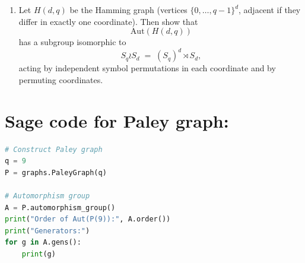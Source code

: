 \documentclass[12pt,a4paper,openany]{book}
\begin{document}
\begin{enumerate}
For any $b \in \mathbb{F}_q$, define the translation
\[
\tau_b: x \mapsto x+b.
\]
If $x \sim y$ in $P(q)$, then $x-y \in (\mathbb{F}_q^\times)^2$, so
\[
\tau_b(x) - \tau_b(y) = (x+b)-(y+b) = x-y \in (\mathbb{F}_q^\times)^2.
\]
Thus, $\tau_b$ is an automorphism. The set of all translations forms a group isomorphic to $(\mathbb{F}_q,+)$.



Let $a \in (\mathbb{F}_q^\times)^2$ be a nonzero square, and define
\[
\mu_a: x \mapsto ax.
\]
If $x \sim y$, then $x-y$ is a square, so
\[
\mu_a(x) - \mu_a(y) = a(x-y)
\]
is also a square. Hence, $\mu_a$ is an automorphism. The set of all such $\mu_a$ forms a group of order $(q-1)/2$.



Let $\sigma \in \mathrm{Gal}(\mathbb{F}_q / \mathbb{F}_p)$, where $q = p^n$ and $p$ is the characteristic of $\mathbb{F}_q$. Then $\sigma$ is a field automorphism:
\[
x \mapsto \sigma(x), \quad x \in \mathbb{F}_q.
\]
If $x \sim y$, then $x-y$ is a square, and
\[
\sigma(x) - \sigma(y) = \sigma(x-y)
\]
is still a square because field automorphisms preserve multiplicative structure. Therefore, $\sigma$ is an automorphism of $P(q)$.



Combining the above, any automorphism of the form
\[
x \mapsto a\,\sigma(x) + b, \quad a \in (\mathbb{F}_q^\times)^2, \; b \in \mathbb{F}_q, \; \sigma \in \mathrm{Gal}(\mathbb{F}_q/\mathbb{F}_p),
\]
preserves adjacency. These form the group
\[
\mathrm{Aut}(P(q)) \supseteq \left\{ x \mapsto a x + b \;\middle|\; a \in (\mathbb{F}_q^\times)^2,\, b \in \mathbb{F}_q \right\} \rtimes \mathrm{Gal}(\mathbb{F}_q/\mathbb{F}_p),
\]
where the semidirect product $\rtimes$ encodes that the Galois automorphisms act on both the additive and multiplicative parts.
).

\item Let $H(d,q)$ be the Hamming graph (vertices $\{0,\dots,q-1\}^d$, adjacent if they differ in exactly one coordinate). Then show that
\[
\mathrm{Aut}(H(d,q)) \] has a subgroup isomorphic to \[ S_q \wr S_d \;=\; (S_q)^d \rtimes S_d,
\]
acting by independent symbol permutations in each coordinate and by permuting coordinates.
\end{enumerate}

\section*{Sage code for Paley graph:}
\begin{lstlisting}[language=Python]
# Construct Paley graph
q = 9
P = graphs.PaleyGraph(q)

# Automorphism group
A = P.automorphism_group()
print("Order of Aut(P(9)):", A.order())
print("Generators:")
for g in A.gens():
    print(g)
\end{lstlisting}
\end{document}
